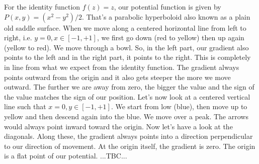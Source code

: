 \documentclass[12pt]{article}
\begin{document}
\medskip
For the identity function $f(z) = z$, our potential function is given by $P(x,y) = (x^2 - y^2)/2$. That's a parabolic hyperboloid also known as a plain old saddle surface. When we move along a centered horizontal line from left to right, i.e. $y = 0, x \in [-1,+1]$, we first go down (red to yellow) then  up again (yellow to red). We move through a bowl. So, in the left part, our gradient also points to the left and in the right part, it points to the right. This is completely in line from what we expect from the identity function. The gradient always points outward from the origin and it also gets steeper the more we move outward. The further we are away from zero, the bigger the value and the sign of the value matches the sign of our position. Let's now look at a centered vertical line such that $x = 0, y \in [-1,+1]$. We start from low (blue), then move up to yellow and then descend again into the blue. We move over a peak. The arrows would always point inward toward the origin. Now let's have a look at the diagonals. Along these, the gradient always points into a direction perpendicular to our direction of movement. At the origin itself, the gradient is zero. The origin is a flat point of our potential. ...TBC...
\end{document}
